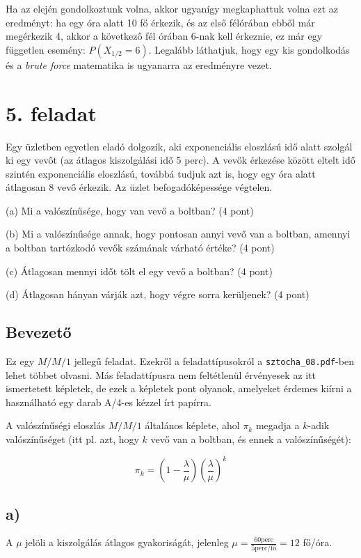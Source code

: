 \documentclass[a4paper,12pt]{article}   		%
\begin{document}
Ha az elején gondolkoztunk volna, akkor ugyanígy megkaphattuk volna ezt az 
eredményt: ha egy óra alatt 10 fő érkezik, és az első félórában ebből már
megérkezik 4, akkor a következő fél órában 6-nak kell érkeznie, ez már 
egy független esemény: $P(X_{1/2} = 6)$. Legalább láthatjuk, hogy egy kis
gondolkodás és a \textit{brute force} matematika is ugyanarra az 
eredményre vezet.

\pagebreak
\section*{5. feladat}
Egy üzletben egyetlen eladó dolgozik, aki exponenciális eloszlású idő 
alatt szolgál ki egy vevőt (az átlagos kiszolgálási idő 5 perc). A vevők
érkezése között eltelt idő  szintén exponenciális eloszlású, továbbá 
tudjuk azt is, hogy egy óra alatt átlagosan 8 vevő érkezik. Az üzlet 
befogadóképessége végtelen.

(a) Mi a valószínűsége, hogy van vevő a boltban? (4 pont)

(b) Mi a valószínűsége annak, hogy pontosan annyi vevő van a boltban, 
amennyi a boltban tartózkodó vevők számának várható értéke? (4 pont)

(c) Átlagosan mennyi időt tölt el egy vevő a boltban? (4 pont)

(d) Átlagosan hányan várják azt, hogy végre sorra kerüljenek? (4 pont)

\subsection*{Bevezető}
Ez egy $M/M/1$ jellegű feladat. Ezekről a feladattípusokról a
\mbox{\texttt{sztocha\_08.pdf}}-ben lehet többet olvasni. Más 
feladattípusra nem feltétlenül érvényesek az itt ismertetett képletek,
de ezek a képletek pont olyanok, amelyeket érdemes kiírni a
használható egy darab A/4-es kézzel írt papírra.

A valószínűségi eloszlás $M/M/1$ általános képlete, ahol $\pi_k$ megadja
a $k$-adik valószínűséget (itt pl. azt, hogy $k$ vevő van a boltban, és
ennek a valószínűségét):

\[
\pi_k = \left( 1 - \frac{\lambda}{\mu} \right) 
\left( \frac{\lambda}{\mu} \right)^k
\]

\subsection*{a)}
A $\mu$ jelöli a kiszolgálás átlagos gyakoriságát, jelenleg 
$\mu = \frac{60 \text{perc}}{5 \text{perc/fő}} = 12$ fő/óra.
\end{document}
